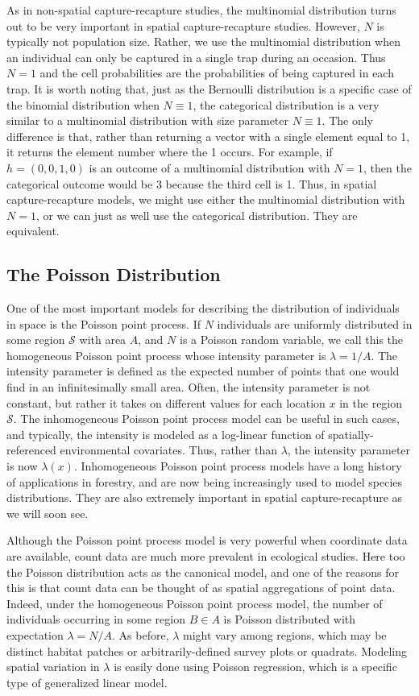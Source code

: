As in non-spatial capture-recapture studies, the multinomial
distribution turns out to be very important in spatial
capture-recapture studies. However, $N$ is typically not population
size. Rather, we use the multinomial distribution when an individual
can only be captured in a single trap during an occasion. Thus
$N=1$ and the cell probabilities are the probabilities of
being captured in each trap.
It is worth noting that, just as the Bernoulli distribution is a specific case of the binomial
distribution when $N \equiv 1$, the categorical distribution is a very
similar to a multinomial distribution with size parameter
$N\equiv1$. The only difference is that, rather than returning a
vector with a single element equal to 1, it returns the element number
where the 1 occurs. For example, if $h=(0,0,1,0)$ is an outcome of a
multinomial distribution with $N=1$, then the categorical outcome
would be 3 because the third cell is 1. Thus, in spatial
capture-recapture models, we might use either the multinomial
distribution with $N=1$, or we can just as well use the categorical
distribution. They are equivalent.


\subsection{The Poisson Distribution}

One of the most important models for describing the distribution
of individuals in space is the Poisson point
process. If $N$ individuals are uniformly distributed in some region
$\mathcal{S}$ with area $A$, and $N$ is a Poisson
random variable, we call this the homogeneous Poisson point process
whose intensity parameter is $\lambda = 1/A$. The intensity parameter
is defined as the expected number of points that one would find in an
infinitesimally small area. Often, the intensity parameter is not
constant, but rather it takes on different values for each location
$x$ in the region $\mathcal{S}$. The inhomogeneous Poisson point
process model can be useful in such cases, and typically, the
intensity is modeled as a log-linear function of spatially-referenced
environmental covariates. Thus, rather than $\lambda$, the intensity
parameter is now $\lambda(x)$. Inhomogeneous Poisson point process
models have a long history of applications in forestry, and are now
being increasingly used to model species distributions. They are also
extremely important in spatial capture-recapture as we will soon see.

Although the Poisson point process model is very powerful when
coordinate data are available, count data are much more prevalent in
ecological studies. Here too the Poisson distribution acts as the
canonical model, and one of the reasons for this is that count data
can be thought of as spatial aggregations of point data.
Indeed, under the homogeneous Poisson point process model,
the number of individuals occurring in some
region $B \in A$ is Poisson distributed with expectation
$\lambda = N/A$. As before, $\lambda$ might vary among regions, which
may be distinct habitat patches or arbitrarily-defined survey plots or
quadrats. Modeling spatial variation in $\lambda$ is easily done using
Poisson regression, which is a specific type of generalized linear
model.

